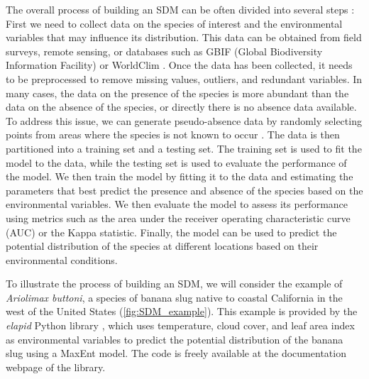 
The overall process of building an SDM can be often divided into several
steps \cite{Elith2006}: First we need to collect data on the species of
interest and the environmental variables that may influence its distribution.
This data can be obtained from field surveys, remote sensing, or databases such
as GBIF (Global Biodiversity Information Facility) \cite{GBIF} or WorldClim
\cite{WorldClim}. Once the data has been collected, it needs to be preprocessed
to remove missing values, outliers, and redundant variables. In many cases,
the data on the presence of the species is more abundant than the data on the
absence of the species, or directly there is no absence data available. To
address this issue, we can generate pseudo-absence data by randomly selecting
points from areas where the species is not known to occur
\cite{Iturbide2015}. The data is then partitioned into a training set and a
testing set. The training set is used to fit the model to the data, while the
testing set is used to evaluate the performance of the model. We then train the
model by fitting it to the data and estimating the parameters that best predict
the presence and absence of the species based on the environmental variables.
We then evaluate the model to assess its performance using metrics such as the
area under the receiver operating characteristic curve (AUC) or the Kappa
statistic. Finally, the model can be used to predict the potential
distribution of the species at different locations based on their environmental
conditions.

To illustrate the process of building an SDM, we will consider the example of
\textit{Ariolimax buttoni}, a species of banana slug native to coastal
California in the west of the United States (\cref{fig:SDM_example}). This
example is provided by the \textit{elapid} Python library \cite{Elapid},
which uses temperature, cloud cover, and leaf area index as environmental
variables to predict the potential distribution of the banana slug using a
MaxEnt model. The code is freely available at the documentation webpage of the
library.

